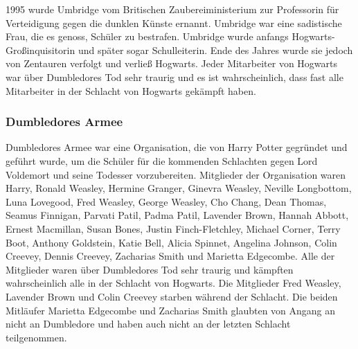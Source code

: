 \documentclass[a4paper, 10pt]{article}
\begin{document}
\vspace{10pt}
\newline
{}  
1995 wurde Umbridge vom Britischen Zaubereiministerium zur Professorin für Verteidigung gegen die dunklen Künste ernannt. Umbridge war eine sadistische Frau, die es genoss, Schüler zu bestrafen. Umbridge wurde anfangs Hogwarts-Großinquisitorin und später sogar Schulleiterin. Ende des Jahres wurde sie jedoch von Zentauren verfolgt und verließ Hogwarts.
\vspace{10pt}
\newline
{}  
Jeder Mitarbeiter von Hogwarts war über Dumbledores Tod sehr traurig und es ist wahrscheinlich, dass fast alle Mitarbeiter in der Schlacht von Hogwarts gekämpft haben.
\subsubsection*{\large Dumbledores Armee}
Dumbledores Armee war eine Organisation, die von Harry Potter gegründet und geführt wurde, um die Schüler für die kommenden Schlachten gegen Lord Voldemort und seine Todesser vorzubereiten.
\vspace{10pt}
\newline
{}  
Mitglieder der Organisation waren Harry, Ronald Weasley, Hermine Granger, Ginevra Weasley, Neville Longbottom, Luna Lovegood, Fred Weasley, George Weasley, Cho Chang, Dean Thomas, Seamus Finnigan, Parvati Patil, Padma Patil, Lavender Brown, Hannah Abbott, Ernest Macmillan, Susan Bones, Justin Finch-Fletchley, Michael Corner, Terry Boot, Anthony Goldstein, Katie Bell, Alicia Spinnet, Angelina Johnson, Colin Creevey, Dennis Creevey, Zacharias Smith und Marietta Edgecombe.
\vspace{10pt}
\newline
{}  
Alle der Mitglieder waren über Dumbledores Tod sehr traurig und kämpften wahrscheinlich alle in der Schlacht von Hogwarts. Die Mitglieder Fred Weasley, Lavender Brown und Colin Creevey starben während der Schlacht. Die beiden Mitläufer Marietta Edgecombe und Zacharias Smith glaubten von Angang an nicht an Dumbledore und haben auch nicht an der letzten Schlacht teilgenommen.
\end{document}
